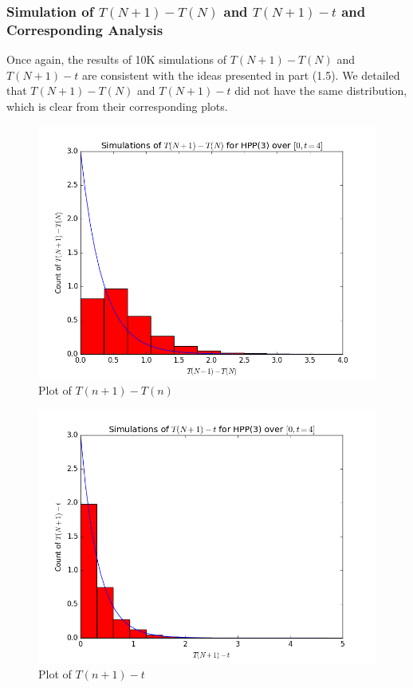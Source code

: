 \documentclass[11pt, oneside]{article}   	%
\begin{document}
\subsubsection{Simulation of $T(N+1)-T(N)$ and $T(N+1)-t$ and Corresponding Analysis}
Once again, the results of 10K simulations of $T(N+1)-T(N)$ and $T(N+1)-t$ are consistent with the ideas presented in part (1.5). We detailed that $T(N+1)-T(N)$ and $T(N+1)-t$ did not have the same distribution, which is clear from their corresponding plots. 
\begin{figure}[H]
\includegraphics[scale=.5]{hpp_tn1_tn}
\caption{Plot of $T(n+1) - T(n)$}
\label{fig:x}
\end{figure}

\begin{figure}[H]
\includegraphics[scale=.5]{hpp_tn1_t}
\caption{Plot of $T(n+1) - t$}
\label{fig:x}
\end{figure}
\end{document}

